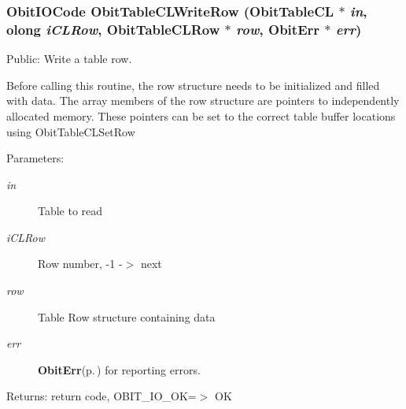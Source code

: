 \subsubsection{\setlength{\rightskip}{0pt plus 5cm}Obit\-IOCode Obit\-Table\-CLWrite\-Row ({\bf Obit\-Table\-CL} $\ast$ {\em in}, {\bf olong} {\em i\-CLRow}, {\bf Obit\-Table\-CLRow} $\ast$ {\em row}, {\bf Obit\-Err} $\ast$ {\em err})}\label{ObitTableCL_8c_a24}


Public: Write a table row. 

Before calling this routine, the row structure needs to be initialized and filled with data. The array members of the row structure are pointers to independently allocated memory. These pointers can be set to the correct table buffer locations using Obit\-Table\-CLSet\-Row \begin{Desc}
\item[Parameters:]
\begin{description}
\item[{\em in}]Table to read \item[{\em i\-CLRow}]Row number, -1 -$>$ next \item[{\em row}]Table Row structure containing data \item[{\em err}]{\bf Obit\-Err}{\rm (p.\,\pageref{structObitErr})} for reporting errors. \end{description}
\end{Desc}
\begin{Desc}
\item[Returns:]return code, OBIT\_\-IO\_\-OK=$>$ OK \end{Desc}
